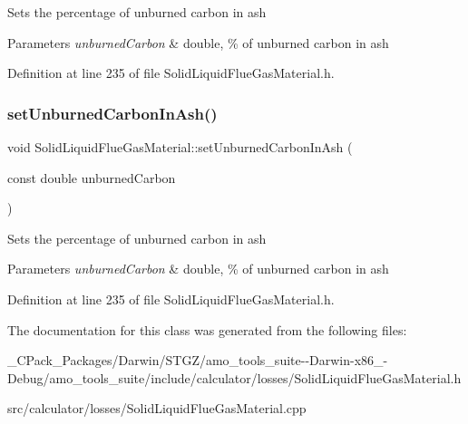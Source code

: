 Sets the percentage of unburned carbon in ash 
\begin{DoxyParams}{Parameters}
{\em unburned\+Carbon} & double, \% of unburned carbon in ash \\
\hline
\end{DoxyParams}


Definition at line 235 of file Solid\+Liquid\+Flue\+Gas\+Material.\+h.

\mbox{\label{class_solid_liquid_flue_gas_material_adf052dd1bdceeab710a4986b1fd874b9}} 
\subsubsection{\texorpdfstring{set\+Unburned\+Carbon\+In\+Ash()}{setUnburnedCarbonInAsh()}\hspace{0.1cm}{\footnotesize\ttfamily [3/3]}}
{\footnotesize\ttfamily void Solid\+Liquid\+Flue\+Gas\+Material\+::set\+Unburned\+Carbon\+In\+Ash (\begin{DoxyParamCaption}\item[{const double}]{unburned\+Carbon }\end{DoxyParamCaption})\hspace{0.3cm}{\ttfamily [inline]}}

Sets the percentage of unburned carbon in ash 
\begin{DoxyParams}{Parameters}
{\em unburned\+Carbon} & double, \% of unburned carbon in ash \\
\hline
\end{DoxyParams}


Definition at line 235 of file Solid\+Liquid\+Flue\+Gas\+Material.\+h.



The documentation for this class was generated from the following files\+:\begin{DoxyCompactItemize}
\item 
\+\_\+\+C\+Pack\+\_\+\+Packages/\+Darwin/\+S\+T\+G\+Z/amo\+\_\+tools\+\_\+suite-\/-\/\+Darwin-\/x86\+\_-\/\+Debug/amo\+\_\+tools\+\_\+suite/include/calculator/losses/Solid\+Liquid\+Flue\+Gas\+Material.\+h\item 
src/calculator/losses/Solid\+Liquid\+Flue\+Gas\+Material.\+cpp\end{DoxyCompactItemize}
